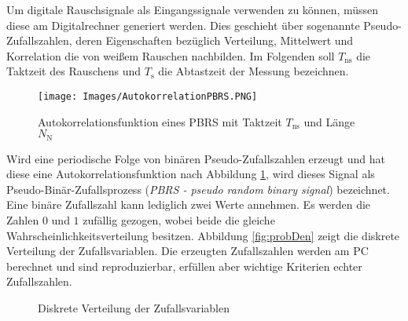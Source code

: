 \documentclass[12pt,report,final,twoside,accentcolor=tud9b,bigchapter]{tudreport}
\newcommand{\ra}[1]{\renewcommand{\arraystretch}{#1}}
\begin{document}
Um digitale Rauschsignale als Eingangssignale verwenden zu können, müssen diese
am Digitalrechner generiert werden. Dies geschieht über sogenannte
Pseudo-Zufallszahlen, deren Eigenschaften bezüglich Verteilung,
Mittelwert und Korrelation die von weißem Rauschen nachbilden. Im
Folgenden soll $T_{\mathrm{ns}}$ die Taktzeit des Rauschens und
$T_\mathrm{s}$ die Abtastzeit der Messung bezeichnen.
\begin{figure}[h!]
  \centering
      \texttt{[image: Images/AutokorrelationPBRS.PNG]}
      \caption{Autokorrelationsfunktion eines PBRS mit Taktzeit
$T_{\mathrm{ns}}$ und Länge $N_\mathrm{N}$ \citep{skript}}
      \label{fig:AutoPBRS}
\end{figure}
Wird eine periodische Folge von binären Pseudo-Zufallszahlen erzeugt und
hat diese eine Autokorrelationsfunktion nach Abbildung \ref{fig:AutoPBRS},
wird dieses Signal als Pseudo-Binär-Zufallsprozess (\textit{PBRS -
pseudo random binary signal}) bezeichnet. Eine binäre Zufallszahl kann lediglich zwei Werte annehmen. Es werden die Zahlen $0$ und $1$ zufällig gezogen, wobei beide die gleiche Wahrscheinlichkeitsverteilung besitzen. Abbildung \ref{fig:probDen} zeigt die diskrete Verteilung der Zufallsvariablen. Die erzeugten Zufallszahlen werden am PC berechnet und sind reproduzierbar, erfüllen aber wichtige Kriterien echter Zufallszahlen. \cite{MC}
\begin{figure}[h!] 
\begin{minipage}[t]{0.48\linewidth}     
  \centering
{}
\caption{Diskrete Verteilung der Zufallsvariablen}
\label{fig:probDen}
\end{minipage}
  \hfill
\begin{minipage}[t]{0.47\textwidth}
	\ra{1.2}
		\centering
		\label{tab:MLBS}
\end{minipage}
\end{figure}
\end{document}
